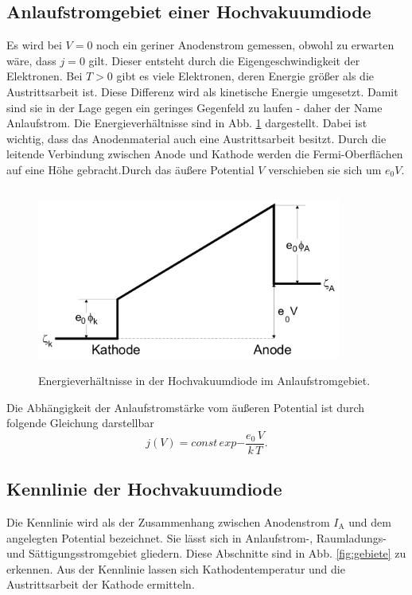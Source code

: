 \subsection{Anlaufstromgebiet einer Hochvakuumdiode}

Es wird bei $V = 0$ noch ein geriner Anodenstrom gemessen, 
obwohl zu erwarten wäre, dass $j = 0$ gilt. Dieser entsteht 
durch die Eigengeschwindigkeit der Elektronen. Bei $T > 0$ 
gibt es viele Elektronen, deren Energie größer als die 
Austrittsarbeit ist. Diese Differenz wird als kinetische 
Energie umgesetzt. Damit sind sie in der Lage gegen ein 
geringes Gegenfeld zu laufen - daher der Name Anlaufstrom. 
Die Energieverhältnisse sind in Abb. \ref{fig:energie}
dargestellt. Dabei ist wichtig, dass das Anodenmaterial auch 
eine Austrittsarbeit besitzt. Durch die leitende Verbindung 
zwischen Anode und Kathode werden die Fermi-Oberflächen auf 
eine Höhe gebracht.Durch das äußere Potential $V$ 
verschieben sie sich um $e_0 V$.

\begin{figure}
    \centering
    \includegraphics[width=10cm, height=6cm]{build/energie.png}
    \caption{Energieverhältnisse in der Hochvakuumdiode im Anlaufstromgebiet. \cite{V504}}
    \label{fig:energie}
\end{figure}

\noindent Die Abhängigkeit der Anlaufstromstärke vom äußeren
Potential ist durch folgende Gleichung darstellbar
\begin{equation}
    j(V) = const \, exp{-\frac{e_0 \, V}{k \, T}}.
    \label{eqn:anlauf}
\end{equation}

\subsection{Kennlinie der Hochvakuumdiode}

Die Kennlinie wird als der Zusammenhang zwischen Anodenstrom 
$I_\text{A}$ und dem angelegten Potential bezeichnet. 
Sie lässt sich in Anlaufstrom-, Raumladungs- und 
Sättigungsstromgebiet gliedern. 
Diese Abschnitte sind in Abb. \ref{fig:gebiete} zu erkennen.
Aus der Kennlinie lassen sich Kathodentemperatur und die 
Austrittsarbeit der Kathode ermitteln.

